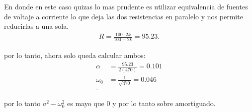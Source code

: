 \documentclass[12pt]{exam}
\begin{document}
\begin{enumerate}
  En donde en este caso quizas lo mas prudente es utilizar equivalencia de fuentes de voltaje a corriente lo que deja las dos resistencias en paralelo y nos permite reducirlas a una sola.
  \begin{align*}
    R = \frac{100 \cdot  2k}{100 + 2k} = 95.23
  .\end{align*}

  por lo tanto, ahora solo queda calcular ambos:
  \begin{align*}
    \alpha &= \frac{95.23}{2\left( 470 \right) } = 0.101\\
    \omega_{0} &= \frac{1}{\sqrt{470} } = 0.046 \\
  .\end{align*}

  por lo tanto $a^2-\omega_0^2$ es mayo que $0$ y por lo tanto sobre amortiguado.
  
\end{enumerate}
\end{document}
